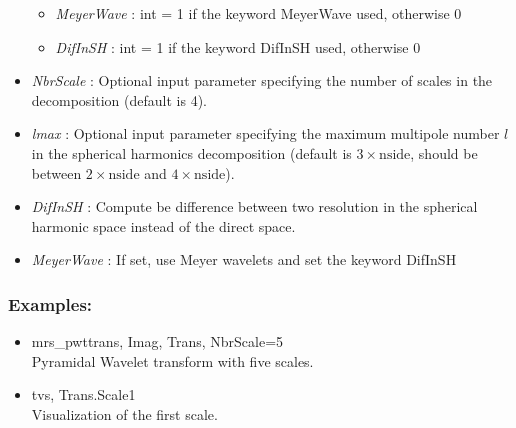 \begin{itemize}
\begin{itemize}
\item {\em MeyerWave} : int = 1 if the keyword MeyerWave used, otherwise 0
\item {\em DifInSH} : int = 1 if the keyword DifInSH used, otherwise 0
\end{itemize}
\item {\em NbrScale} : Optional input parameter specifying the number of scales in the decomposition (default is 4).
\item {\em lmax} : Optional input parameter specifying the maximum multipole number $l$ in the spherical harmonics decomposition 
(default is $3\times \textrm{nside}$, should be between $2\times \textrm{nside}$ and $4\times \textrm{nside}$).
\item {\em DifInSH} : Compute be difference between two resolution in the spherical harmonic space instead of the direct space.
\item {\em MeyerWave} : If set, use Meyer wavelets and set the keyword DifInSH 
\end{itemize}

\subsubsection*{Examples:} 
\begin{itemize}
\item mrs\_pwttrans, Imag, Trans, NbrScale=5 \\
Pyramidal Wavelet transform with five scales.
\item  tvs, Trans.Scale1  \\
Visualization of the first scale.
\end{itemize}



